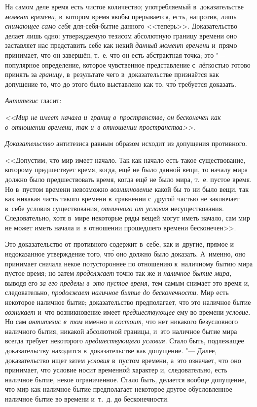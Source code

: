 На самом деле время есть чистое количество; употребляемый в~доказательстве
{\em момент времени,} в~котором время якобы прерывается, есть, напротив,
лишь {\em снимающее само себя} для-себя-бытие данного <<теперь>>.
Доказательство делает лишь одно: утверждаемую тезисом абсолютную границу
времени оно заставляет нас представить себе как некий
{\em данный момент времени} и~прямо принимает, что он завершён, т.~е. что он
есть абстрактная точка; это "--- популярное определение, которое чувственное
представление с~лёгкостью готово принять за {\em границу,} в~результате чего
в~доказательстве признаётся как допущение то, что до этого было выставлено как
то, чт\'{о} требуется доказать.

{\em Антитезис} гласит:

{\em <<Мир не имеет начала и~границ в~пространстве; он бесконечен
как в~отношении времени, так и~в отношении пространства>>.}

{\em Доказательство} антитезиса равным образом исходит из допущения противного.

<<Допустим, что мир имеет начало. Так как начало есть такое существование,
которому предшествует время, когда, ещё не было данной вещи, то началу мира
должно было предшествовать время, когда ещё не было мира, т.~е. пустое время.
Но в~пустом времени невозможно {\em возникновение} какой бы то ни было вещи,
так как никакая часть такого времени в~сравнении с~другой частью не заключает
в~себе условия существования, {\em отличного от условия} несуществования.
Следовательно, хотя в~мире некоторые ряды вещей могут иметь начало,
сам мир не может иметь начала и~в отношении прошедшего времени бесконечен>>.

Это доказательство от противного содержит в~себе, как и~другие, прямое и
недоказанное утверждение того, чт\'{о} оно должно было доказать. А~именно, оно
принимает сначала некое потустороннее по отношению к~наличному бытию мира
пустое время; но затем {\em продолжает} точно так же и
{\em наличное бытие мира,} выводя его {\em за его пределы в~это пустое время,}
тем самым снимает это время и, следовательно,
{\em продолжает наличное бытие до бесконечности}. Мир есть некоторое
наличное бытие; доказательство предполагает, что это наличное бытие
{\em возникает} и~что возникновение имеет {\em предшествующее} ему во времени
{\em условие}. Но сам {\em антитезис в~том} именно и {\em состоит,} что нет
никакого безусловного наличного бытия, никакой абсолютной границы, и~это наличное
бытие мира всегда требует некоторого {\em предшествующего условия}. Стало
быть, подлежащее доказательству находится в~доказательстве как
допущение. "--- Далее, доказательство ищет затем {\em условия} в~пустом
времени, а~это означает, что оно принимает, что условие носит временн\'{о}й
характер и, следовательно, есть наличное бытие, некое ограниченное. Стало быть,
делается вообще допущение, что мир как наличное бытие предполагает некоторое
другое обусловленное наличное бытие во времени и~т.~д. до бесконечности.

